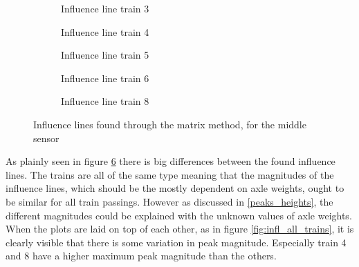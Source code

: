 	\begin{figure}[H]
		\begin{subfigure}[t]{0.4\textwidth}
			
			\caption{Influence line train 3}
			\label{fig:train3}
		\end{subfigure}
		\qquad
		\begin{subfigure}[t]{0.4\textwidth}
			
			\caption{Influence line train 4}
			\label{fig:train4}
		\end{subfigure}
		\begin{subfigure}[t]{0.4\textwidth}
			\centering
			
			\caption{Influence line train 5}
			\label{fig:train5}
		\end{subfigure}
		\qquad
		\begin{subfigure}[t]{0.4\textwidth}
			\centering
			
			\caption{Influence line train 6}
			\label{fig:train6}
		\end{subfigure}
		\begin{subfigure}[t]{0.9\textwidth}
			\centering
			
			\caption{Influence line train 8}
			\label{fig:train8}
		\end{subfigure}
		\caption{Influence lines found through the matrix method, for the middle sensor}
		\label{fig:Influence_lines}
	\end{figure}



As plainly seen in figure \ref{fig:Influence_lines} there is big differences between the found influence lines. The trains are all of the same type meaning that the magnitudes of the influence lines, which should be the mostly dependent on axle weights, ought to be similar for all train passings. However as discussed in \ref{peaks_heights}, the different magnitudes could be explained with the unknown values of axle weights. When the plots are laid on top of each other, as in figure \ref{fig:infl_all_trains}, it is clearly visible that there is some variation in peak magnitude. Especially train 4 and 8 have a higher maximum peak magnitude than the others.

